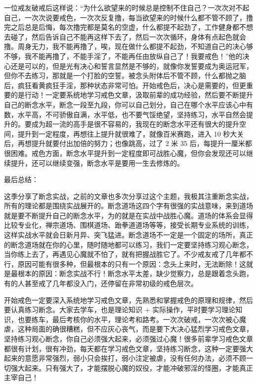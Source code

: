 一位戒友破戒后这样说：“为什么欲望来的时候总是控制不住自己？一次次对不起自己，一次次说要戒色，一次次反复撸，每当欲望来的时候什么都不管不顾了，撸完之后总是后悔，每次撸完都是莫名的空虚，什么都提不起劲了，工作健身都不想去碰了，然后告诉自己不能再这样下去了，然后一次次循环，身体有点起色就会撸。周身无力，我不能再撸了，唉，现在做什么都提不起劲，不知道自己的决心够不够，我不能再撸了，不能手淫了，不能再任由放纵自己了！我要戒色！”他的决心还是可以的，但是光有决心和誓言显然是不够的，就像你发誓要成为奥运冠军，但你不去练习，那就是一个打脸的空誓。被念头附体后不管不顾，什么都抛之脑后，疯狂看黄疯狂手淫，那种状态非常可怕。开始戒色后，决心是需要的，但更重要的是行动！一定要系统地学习戒色文章，汲取前辈的成功经验，然后要不断提升自己的断念水平，断念一段至九段，你可以自己划分，自己在哪个水平应该心中有数，水平高，不可骄傲自满，水平低，也不要气馁绝望，坚持练习，水平自然会提升的。要成为超一流的高手是很不容易的，我现在的断念水平还有很大的提升空间，提升到一定程度，再想往上提升就很难了，就像百米赛跑，进入 10 秒大关后，再想提升就要付出加倍的努力；也像跳高，过了 2 米 35 后，每提升一厘米都很困难。戒色方面，断念水平提升到一定程度即可战胜心魔，但你会发现还可以继续提升，还可以继续变强，断念水平是要用一生去修炼的。

最后总结：

这季分享了断念实战，之前的文章也多次分享过这个主题，我极其注重断念实战，所有的理论都是围绕实战展开的。断念道场这四个字有很强的实战意味，来到道场就是要不断提升自己的断念水平，为的就是在实战中战胜心魔。道场的体系会显得比较专业化，禅宗道场、围棋道场、跆拳道道场等等，接受长期专业系统的训练，这样实战水平就会日新月异、突飞猛进。断念道场不一定是一个固定的场所，真正的断念道场就在你的心里，随时随地都可以练习，我们一定要坚持练习观心断念，当你练上去了，再遇见心魔就不怕了，就有把握战胜它了。不少戒友戒了几年都不行，原因可能有很多种，但最根本的只有一个原因：念头上来时，无法断除！这就是最根本的原因：断念实战不行！断念水平太差，缺少觉察力，总是跟着念头跑，有的人甚至戒了几年都没入门，还停留在非常初级的戒色层次。

开始戒色一定要深入系统地学习戒色文章，先熟悉和掌握戒色的原理和规律，然后要认真练习断念。大家去学车，也是理论知识 + 实际操作，平时要学习理论知识，也要练车，最后考核你的水平，理论考和路考。一次次破戒，一次次被心魔虐，这种局面的确很糟糕，但不应灰心丧气，而是要下大决心猛烈学习戒色文章，坚持练习观心断念，你自己必须强大起来，必须强过心魔！很多前辈学习戒色文章都很有计划，很有冲劲，每天都在学习戒色文章，坚持练习断念，这种一定要强大起来的意愿非常强烈，弱小只会挨打，弱小注定被虐，没有任何办法，必须不顾一切强大起来。只有强大了，才能摆脱心魔的奴役，才能冲破邪淫的怪圈，才能真正主宰自己！

